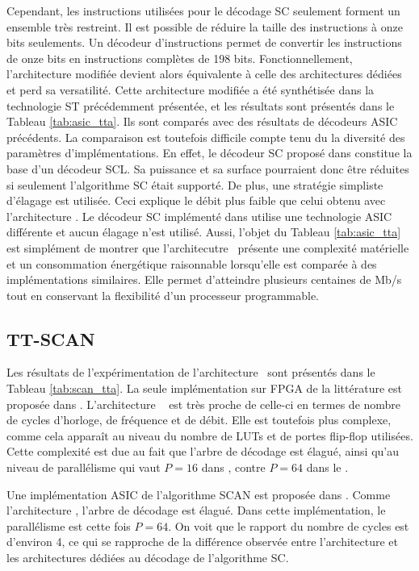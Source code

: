 Cependant, les instructions utilisées pour le décodage SC seulement forment un ensemble très restreint. Il est possible de réduire la taille des instructions à onze bits seulements. Un décodeur d'instructions permet de convertir les instructions de onze bits en instructions complètes de 198 bits. Fonctionnellement, l'architecture \TTSC modifiée devient alors équivalente à celle des architectures dédiées et perd sa versatilité. Cette architecture modifiée a été synthétisée dans la technologie ST précédemment présentée, et les résultats sont présentés dans le Tableau \ref{tab:asic_tta}. Ils sont comparés avec des résultats de décodeurs ASIC précédents. La comparaison est toutefois difficile compte tenu du la diversité des paramètres d'implémentations. En effet, le décodeur SC proposé dans \cite{giard_polarbear:_2017} constitue la base d'un décodeur SCL. Sa puissance et sa surface pourraient donc être réduites si seulement l'algorithme SC était supporté. De plus, une stratégie simpliste d'élagage est utilisée. Ceci explique le débit plus faible que celui obtenu avec l'architecture \TTSC. Le décodeur SC implémenté dans \cite{mishra_successive_2012} utilise une technologie ASIC différente et aucun élagage n'est utilisé. Aussi, l'objet du Tableau \ref{tab:asic_tta} est simplément de montrer que l'architecutre \TTSC~présente une complexité matérielle et un consommation énergétique raisonnable lorsqu'elle est comparée à des implémentations similaires. Elle permet d'atteindre plusieurs centaines de Mb/s tout en conservant la flexibilité d'un processeur programmable.


\subsection{TT-SCAN}

Les résultats de l'expérimentation de l'architecture \TTSCAN~sont présentés dans le Tableau \ref{tab:scan_tta}. La seule implémentation sur FPGA de la littérature est proposée dans \cite{berhault_hardware_2015}. L'architecture \TTSCAN~ est très proche de celle-ci en termes de nombre de cycles d'horloge, de fréquence et de débit. Elle est toutefois plus complexe, comme cela apparaît au niveau du nombre de LUTs et de portes flip-flop utilisées. Cette complexité est due au fait que l'arbre de décodage est élagué, ainsi qu'au niveau de parallélisme qui vaut $P=16$ dans \cite{berhault_hardware_2015}, contre $P=64$ dans le \TTSCAN.

Une implémentation ASIC de l'algorithme SCAN est proposée dans \cite{lin_reduced_2015}. Comme l'architecture \TTSCAN, l'arbre de décodage est élagué. Dans cette implémentation, le parallélisme est cette fois $P=64$. On voit que le rapport du nombre de cycles est d'environ 4, ce qui se rapproche de la différence observée entre l'architecture \TTSC et les architectures dédiées au décodage de l'algorithme SC.

